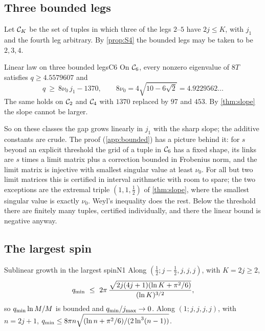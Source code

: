 \subsection{Three bounded legs}

Let $\mathcal{C}_K$ be the set of tuples in which three of the legs $2$--$5$ have $2j\le K$, with
$j_1$ and the fourth leg arbitrary. By \cref{prop:S4} the bounded legs may be taken to
be $2,3,4$.

\begin{theorem}{Linear law on three bounded legs}{C6}
On $\mathcal{C}_6$, every nonzero eigenvalue of $8T$ satisfies $q\ge4.5579607$ and
\[
  q\ \ge\ 8\nu_0\,j_1-1370,\qquad 8\nu_0=4\sqrt{10-6\sqrt2}=4.9229562\ldots
\]
The same holds on $\mathcal{C}_2$ and $\mathcal{C}_4$ with $1370$ replaced by $97$ and $453$. By
\cref{thm:slope} the slope cannot be larger.
\end{theorem}

So on these classes the gap grows linearly in $j_1$ with the sharp slope; the additive
constants are crude. The proof (\cref{app:bounded}) has a picture behind it: for $s$
beyond an explicit threshold the grid of a tuple in $\mathcal{C}_6$ has a fixed shape, its links
are $s$ times a limit matrix plus a correction bounded in Frobenius norm, and the limit
matrix is injective with smallest singular value at least $\nu_0$. For all but two limit
matrices this is certified in interval arithmetic with room to spare; the two exceptions
are the extremal triple $(1,1,\frac12)$ of \cref{thm:slope}, where the smallest singular
value is exactly $\nu_0$. Weyl's inequality does the rest. Below the threshold there are
finitely many tuples, certified individually, and there the linear bound is negative
anyway.

\subsection{The largest spin}

\begin{theorem}{Sublinear growth in the largest spin}{N1}
Along $(\frac12;j-\frac12,j,j,j)$, with $K=2j\ge2$,
\[
  q_{\min}\ \le\ 2\pi\,\frac{\sqrt{2j(4j+1)(\ln K+\pi^2/6)}}{(\ln K)^{3/2}},
\]
so $q_{\min}\ln M/M$ is bounded and $q_{\min}/j_{\max}\to0$. Along $(1;j,j,j,j)$, with
$n=2j+1$, $q_{\min}\le8\pi n\sqrt{(\ln n+\pi^2/6)/(2\ln^3(n-1))}$.
\end{theorem}

